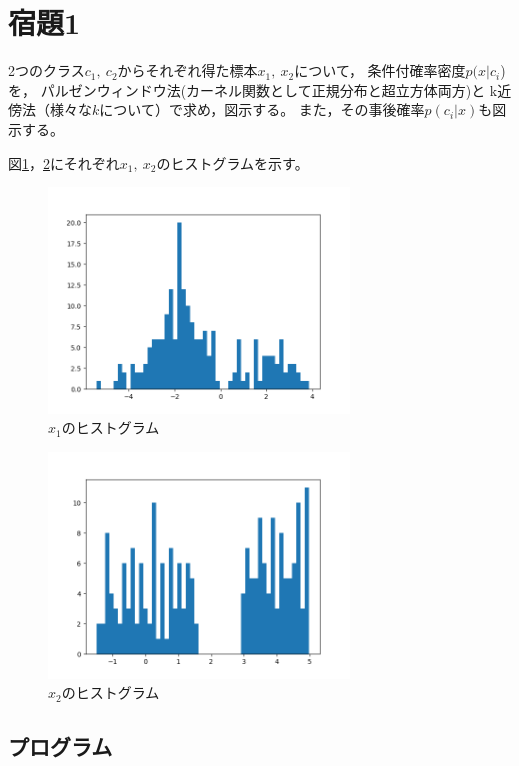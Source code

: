 \documentclass[class=jsarticle, crop=false, dvipdfmx, fleqn]{standalone}
\begin{document}
\section*{宿題1}

2つのクラス\(c_1,\ c_2\)からそれぞれ得た標本\(x_1,\ x_2\)について，
条件付確率密度\(p(x|c_i\))を，
パルゼンウィンドウ法(カーネル関数として正規分布と超立方体両方)と
k近傍法（様々な\(k\)について）で求め，図示する。
また，その事後確率\(p(c_i|x)\)も図示する。

図\ref{fig:x1}，\ref{fig:x2}にそれぞれ\(x_1,\ x_2\)のヒストグラムを示す。

\begin{figure}
    \centering
    \includegraphics[clip, width=8cm]{../figures/x1}
    \caption{\(x_1\)のヒストグラム}
    \label{fig:x1}
\end{figure}

\begin{figure}
    \centering
    \includegraphics[clip, width=8cm]{../figures/x2}
    \caption{\(x_2\)のヒストグラム}
    \label{fig:x2}
\end{figure}



\subsection*{プログラム}
\end{document}
